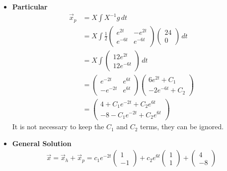 {\begin{itemize}
        \item \textbf{Particular}\\
        \begin{align}
            \vec x_p &= X \int X^{-1} g \, dt \\
            &= X \int \frac{1}{2} \begin{pmatrix} e^{2t} & -e^{2t} \\ e^{-6t} & e^{-6t} \end{pmatrix} \begin{pmatrix} 24 \\ 0 \end{pmatrix} \, dt \\
            & = X \int \begin{pmatrix} 12e^{2t} \\ 12e^{-6t} \end{pmatrix} \, dt \\
            &= \begin{pmatrix} e^{-2t} & e^{6t} \\ -e^{-2t} & e^{6t} \end{pmatrix} \begin{pmatrix} 6e^{2t} + C_1 \\ -2e^{-6t} + C_2 \end{pmatrix} \\
            &=  \begin{pmatrix} 4 + C_1 e^{-2t} + C_2 e^{6t} \\ -8 - C_1 e^{-2t} + C_2 e^{6t} \end{pmatrix}
        \end{align}  
        It is not necessary to keep the $C_1$ and $C_2$ terms, they can be ignored. 
        \item \textbf{General Solution}
        \begin{align}
            \vec x = \vec x_h + \vec x_p = c_1 e^{-2t}\begin{pmatrix} 1\\-1\end{pmatrix} + c_2 e^{6t}\begin{pmatrix} 1\\1\end{pmatrix} + \begin{pmatrix} 4\\-8\end{pmatrix}
        \end{align}

    \end{itemize}




    } 
    \else 
    \fi    
\fi

